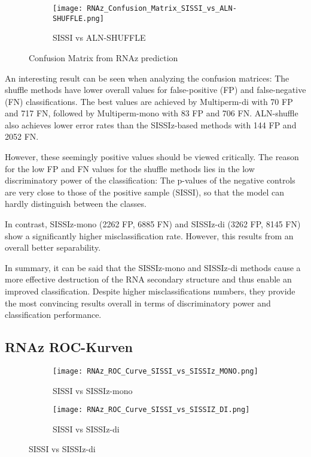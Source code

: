 \documentclass{article}
\begin{document}
\begin{large}
\begin{large}
\begin{large}
\begin{figure}[H]
    \begin{subfigure}[b]{0.48\textwidth}
        \texttt{[image: RNAz\_Confusion\_Matrix\_SISSI\_vs\_ALN-SHUFFLE.png]}
        \caption{SISSI vs ALN-SHUFFLE}
    \end{subfigure}

    \caption{Confusion Matrix from RNAz prediction}
\end{figure}

An interesting result can be seen when analyzing the confusion matrices: The shuffle methods have lower overall values for false-positive (FP) and false-negative (FN) classifications. The best values are achieved by Multiperm-di with 70 FP and 717 FN, followed by Multiperm-mono with 83 FP and 706 FN. ALN-shuffle also achieves lower error rates than the SISSIz-based methods with 144 FP and 2052 FN.\vspace{1em}

However, these seemingly positive values should be viewed critically. The reason for the low FP and FN values for the shuffle methods lies in the low discriminatory power of the classification: The p-values of the negative controls are very close to those of the positive sample (SISSI), so that the model can hardly distinguish between the classes.\vspace{1em}

In contrast, SISSIz-mono (2262 FP, 6885 FN) and SISSIz-di (3262 FP, 8145 FN) show a significantly higher misclassification rate. However, this results from an overall better separability.\vspace{1em}

In summary, it can be said that the SISSIz-mono and SISSIz-di methods cause a more effective destruction of the RNA secondary structure and thus enable an improved classification. Despite higher misclassifications numbers, they provide the most convincing results overall in terms of discriminatory power and classification performance.\vspace{1em}

\subsection{RNAz ROC-Kurven}

\begin{figure}[H]
    \centering
    \begin{subfigure}[b]{0.48\textwidth}
        \texttt{[image: RNAz\_ROC\_Curve\_SISSI\_vs\_SISSIz\_MONO.png]}
        \caption{SISSI vs SISSIz-mono}
        \label{fig:roc_sissiz_mono}
    \end{subfigure}
    \hfill
    \begin{subfigure}[b]{0.48\textwidth}
        \texttt{[image: RNAz\_ROC\_Curve\_SISSI\_vs\_SISSIZ\_DI.png]}
        \caption{SISSI vs SISSIz-di}
        \label{fig:roc_sissiz_di}
    \end{subfigure}
    \vspace{1em}


\end{figure}
\end{large}
\end{large}
\end{large}
\end{document}
